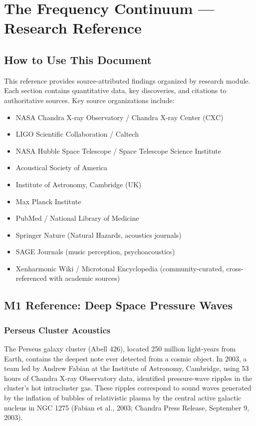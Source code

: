\documentclass[11pt,letterpaper]{article}
\newcommand{\stageheader}[2]{%
  \noindent\colorbox{#2}{\makebox[\textwidth][l]{%
    \textcolor{white}{\bfseries\sffamily\hspace{6pt}#1\hspace{6pt}}}}%
  \vspace{0.5em}\par%
}
\begin{document}
\newpage

\stageheader{STAGE 2 --- RESEARCH REFERENCE}{secondary}

\section{The Frequency Continuum --- Research Reference}

\subsection{How to Use This Document}

This reference provides source-attributed findings organized by research module. Each section contains quantitative data, key discoveries, and citations to authoritative sources. Key source organizations include:

\begin{itemize}[leftmargin=2em]
\item NASA Chandra X-ray Observatory / Chandra X-ray Center (CXC)
\item LIGO Scientific Collaboration / Caltech
\item NASA Hubble Space Telescope / Space Telescope Science Institute
\item Acoustical Society of America
\item Institute of Astronomy, Cambridge (UK)
\item Max Planck Institute
\item PubMed / National Library of Medicine
\item Springer Nature (Natural Hazards, acoustics journals)
\item SAGE Journals (music perception, psychoacoustics)
\item Xenharmonic Wiki / Microtonal Encyclopedia (community-curated, cross-referenced with academic sources)
\end{itemize}

\subsection{M1 Reference: Deep Space Pressure Waves}

\subsubsection{Perseus Cluster Acoustics}
The Perseus galaxy cluster (Abell 426), located 250 million light-years from Earth, contains the deepest note ever detected from a cosmic object. In 2003, a team led by Andrew Fabian at the Institute of Astronomy, Cambridge, using 53 hours of Chandra X-ray Observatory data, identified pressure-wave ripples in the cluster's hot intracluster gas. These ripples correspond to sound waves generated by the inflation of bubbles of relativistic plasma by the central active galactic nucleus in NGC 1275 (Fabian et al., 2003; Chandra Press Release, September 9, 2003).
\end{document}
